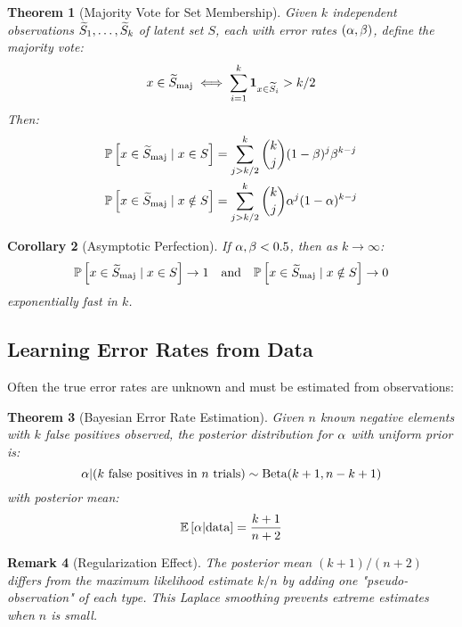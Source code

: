 \documentclass[11pt,final,hidelinks]{article}
\newtheorem{theorem}{Theorem}[section]
\newtheorem{corollary}[theorem]{Corollary}
\newtheorem{remark}[theorem]{Remark}
\begin{document}
\begin{theorem}[Majority Vote for Set Membership]
Given $k$ independent observations $\widetilde{S}_1, \ldots, \widetilde{S}_k$ of latent set $S$, each with error rates $(\alpha, \beta)$, define the majority vote:
\begin{equation}
x \in \widetilde{S}_{\text{maj}} \iff \sum_{i=1}^k \mathbf{1}_{x \in \widetilde{S}_i} > k/2
\end{equation}
Then:
\begin{align}
\mathbb{P}\left[x \in \widetilde{S}_{\text{maj}} \mid x \in S\right] &= \sum_{j > k/2}^k \binom{k}{j} (1-\beta)^j \beta^{k-j} \\
\mathbb{P}\left[x \in \widetilde{S}_{\text{maj}} \mid x \notin S\right] &= \sum_{j > k/2}^k \binom{k}{j} \alpha^j (1-\alpha)^{k-j}
\end{align}
\end{theorem}

\begin{corollary}[Asymptotic Perfection]
If $\alpha, \beta < 0.5$, then as $k \to \infty$:
\begin{equation}
\mathbb{P}\left[x \in \widetilde{S}_{\text{maj}} \mid x \in S\right] \to 1 \quad \text{and} \quad \mathbb{P}\left[x \in \widetilde{S}_{\text{maj}} \mid x \notin S\right] \to 0
\end{equation}
exponentially fast in $k$.
\end{corollary}

\subsection{Learning Error Rates from Data}

Often the true error rates are unknown and must be estimated from observations:

\begin{theorem}[Bayesian Error Rate Estimation]
Given $n$ known negative elements with $k$ false positives observed, the posterior distribution for $\alpha$ with uniform prior is:
\begin{equation}
\alpha | (k \text{ false positives in } n \text{ trials}) \sim \text{Beta}(k+1, n-k+1)
\end{equation}
with posterior mean:
\begin{equation}
\mathbb{E}\left[\alpha | \text{data}\right] = \frac{k+1}{n+2}
\end{equation}
\end{theorem}

\begin{remark}[Regularization Effect]
The posterior mean $(k+1)/(n+2)$ differs from the maximum likelihood estimate $k/n$ by adding one "pseudo-observation" of each type. This Laplace smoothing prevents extreme estimates when $n$ is small.
\end{remark}
\end{document}
